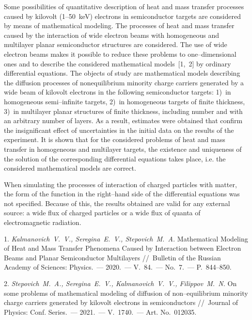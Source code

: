 

\vzmscaption


Some possibilities of quantitative description of heat and mass transfer processes caused by kilovolt (1--50~keV) electrons in semiconductor targets are considered by means of ma\-the\-ma\-ti\-cal modeling. The processes of heat and mass transfer cau\-sed by the interaction of wide electron beams with homogeneous and multilayer planar semiconductor structures are considered. The use of wide electron beams makes it possible to reduce these problems to one--dimensional ones and to describe the con\-si\-de\-red mathematical models~[1,~2] by ordinary differential equations. The objects of study are mathematical models des\-cri\-bing the diffusion processes of nonequilibrium minority cha\-rge carriers generated by a wide beam of kilovolt electrons in the following semiconductor targets: 1)~in homogeneous semi--in\-fi\-nite targets, 2)~in homogeneous targets of finite thickness, 3)~in multilayer planar structures of finite thickness, including number and with an arbitrary number of layers. As a result, estimates were ob\-tai\-ned that confirm the insignificant effect of un\-cer\-tain\-ties in the initial data on the results of the experiment. It is shown that for the considered problems of heat and mass transfer in homogeneous and multilayer targets, the existence and uni\-que\-ness of the solution of the corresponding differential equations takes place, i.e. the considered mathematical models are correct.

When simulating the processes of interaction of char\-ged particles with matter, the form of the function in the right--hand side of the differential equations was not specified. Because of this, the results obtained are valid for any external source: a wide flux of charged particles or a wide flux of quanta of electromagnetic radiation.


\litlist

1. {\it Kalmanovich~V.~V., Seregina~E.~V., Stepovich~M.~A.} Mathematical Modeling of Heat and Mass Transfer Phenomena Caused by Interaction between Electron Beams and Planar Semiconductor Multilayers //~Bulletin of the Russian Academy of Sciences: Physics.~--- 2020.~--- V.~84.~--- No.~7.~--- P.~844--850.

2. {\it Stepovich~M.~A., Seregina~E.~V., Kalmanovich~V.~V., Filippov~M.~N.} On some problems of mathematical modeling of diffusion of non--equilibrium minority charge carriers generated by kilovolt electrons in semiconductors //~Journal of Physics: Conf. Series.~--- 2021.~--- V.~1740.~--- Art. No.~012035.
